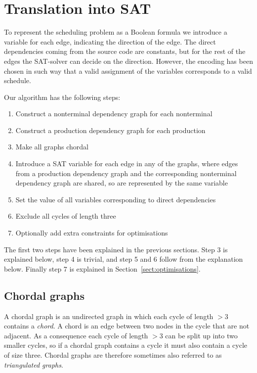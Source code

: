 \documentclass{llncs}
\newcommand{\sectref}[1]{Section~\ref{#1}}
\begin{document}
\section{Translation into SAT} \label{sect:translation}
To represent the scheduling problem as a Boolean formula we introduce a variable for each edge, indicating the direction of the edge. The direct dependencies coming from the source code are constants, but for the rest of the edges the SAT-solver can decide on the direction. However, the encoding has been chosen in such way that a valid assignment of the variables corresponds to a valid schedule.

Our algorithm has the following steps:
\begin{enumerate}
\item Construct a nonterminal dependency graph for each nonterminal
\item Construct a production dependency graph for each production
\item Make all graphs chordal
\item Introduce a SAT variable for each edge in any of the graphs, where edges from a production dependency graph and the corresponding nonterminal dependency graph are shared, so are represented by the same variable
\item Set the value of all variables corresponding to direct dependencies
\item Exclude all cycles of length three
\item Optionally add extra constraints for optimisations
\end{enumerate}
The first two steps have been explained in the previous sections. Step 3 is explained below, step 4 is trivial, and step 5 and 6 follow from the explanation below. Finally step 7 is explained in \sectref{sect:optimisations}.

\subsection{Chordal graphs}
A chordal graph is an undirected graph in which each cycle of length $> 3$ contains a \emph{chord}. A chord is an edge between two nodes in the cycle that are not adjacent. As a consequence each cycle of length $> 3$ can be split up into two smaller cycles, so if a chordal graph contains a cycle it must also contain a cycle of size three. Chordal graphs are therefore sometimes also referred to as \emph{triangulated graphs}.

\end{document}
